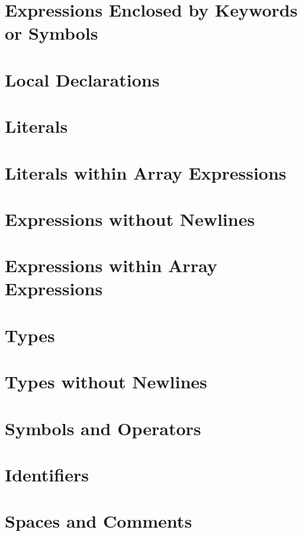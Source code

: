 \section{Expressions Enclosed by Keywords or Symbols}


\section{Local Declarations}


\section{Literals}


\section{Literals within Array Expressions}


\section{Expressions without Newlines}


\section{Expressions within Array Expressions}


\section{Types}


\section{Types without Newlines}


\section{Symbols and Operators}


\section{Identifiers}


\section{Spaces and Comments}


\normalsize
